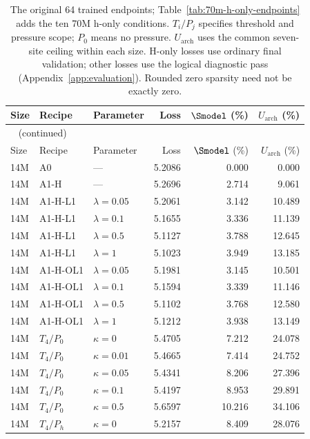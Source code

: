 {\small\renewcommand{\arraystretch}{0.95}
\begin{longtable}{@{}lllrrr@{}}
\caption{The original 64 trained endpoints; Table~\ref{tab:70m-h-only-endpoints} adds the ten 70M h-only conditions. $T_i/P_j$ specifies threshold and pressure scope; $P_0$ means no pressure. $U_{\mathrm{arch}}$ uses the common seven-site ceiling within each size. H-only losses use ordinary final validation; other losses use the logical diagnostic pass (Appendix~\ref{app:evaluation}). Rounded zero sparsity need not be exactly zero.}\label{tab:trained-endpoints}\\
\toprule
Size & Recipe & Parameter & Loss & $\Smodel$ (\%) & $U_{\mathrm{arch}}$ (\%) \\
\midrule
\endfirsthead
\multicolumn{6}{l}{\tablename~\thetable{} (continued)}\\
\toprule
Size & Recipe & Parameter & Loss & $\Smodel$ (\%) & $U_{\mathrm{arch}}$ (\%) \\
\midrule
\endhead
\bottomrule\endfoot
14M & A0 & --- & 5.2086 & 0.000 & 0.000 \\
14M & A1-H & --- & 5.2696 & 2.714 & 9.061 \\
14M & A1-H-L1 & $\lambda=0.05$ & 5.2061 & 3.142 & 10.489 \\
14M & A1-H-L1 & $\lambda=0.1$ & 5.1655 & 3.336 & 11.139 \\
14M & A1-H-L1 & $\lambda=0.5$ & 5.1127 & 3.788 & 12.645 \\
14M & A1-H-L1 & $\lambda=1$ & 5.1023 & 3.949 & 13.185 \\
14M & A1-H-OL1 & $\lambda=0.05$ & 5.1981 & 3.145 & 10.501 \\
14M & A1-H-OL1 & $\lambda=0.1$ & 5.1594 & 3.339 & 11.146 \\
14M & A1-H-OL1 & $\lambda=0.5$ & 5.1102 & 3.768 & 12.580 \\
14M & A1-H-OL1 & $\lambda=1$ & 5.1212 & 3.938 & 13.149 \\
14M & $T_4/P_0$ & $\kappa=0$ & 5.4705 & 7.212 & 24.078 \\
14M & $T_4/P_0$ & $\kappa=0.01$ & 5.4665 & 7.414 & 24.752 \\
14M & $T_4/P_0$ & $\kappa=0.05$ & 5.4341 & 8.206 & 27.396 \\
14M & $T_4/P_0$ & $\kappa=0.1$ & 5.4197 & 8.953 & 29.891 \\
14M & $T_4/P_0$ & $\kappa=0.5$ & 5.6597 & 10.216 & 34.106 \\
14M & $T_4/P_h$ & $\kappa=0$ & 5.2157 & 8.409 & 28.076 \\

\end{longtable}}
